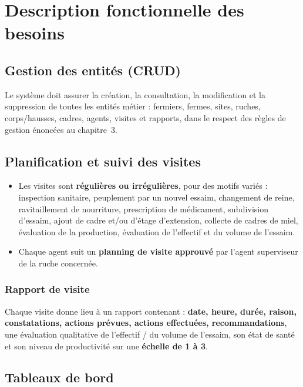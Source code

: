 \chapter{Description fonctionnelle des besoins}

\section{Gestion des entités (CRUD)}
Le système doit assurer la création, la consultation, la modification et la
suppression de toutes les entités métier : fermiers, fermes, sites, ruches,
corps/hausses, cadres, agents, visites et rapports, dans le respect des règles
de gestion énoncées au chapitre~3.

\section{Planification et suivi des visites}
\begin{itemize}
  \item Les visites sont \textbf{régulières ou irrégulières}, pour des motifs variés :
        inspection sanitaire, peuplement par un nouvel essaim, changement de reine,
        ravitaillement de nourriture, prescription de médicament, subdivision d'essaim,
        ajout de cadre et/ou d'étage d'extension, collecte de cadres de miel,
        évaluation de la production, évaluation de l'effectif et du volume de l'essaim.
  \item Chaque agent suit un \textbf{planning de visite approuvé} par l'agent superviseur de la ruche concernée.
\end{itemize}

\subsection{Rapport de visite}
Chaque visite donne lieu à un rapport contenant : \textbf{date, heure, durée,
raison, constatations, actions prévues, actions effectuées, recommandations},
une évaluation qualitative de l'effectif / du volume de l'essaim, son état de
santé et son niveau de productivité sur une \textbf{échelle de 1 à 3}.

\section{Tableaux de bord}

